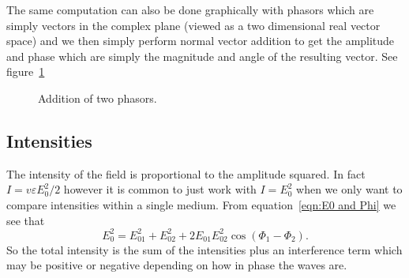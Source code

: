     The same computation can also be done graphically with phasors which are simply vectors in the complex plane (viewed as a two dimensional real vector space) and we then simply perform normal vector addition to get the amplitude and phase which are simply the magnitude and angle of the resulting vector.
    See figure~\ref{fig:phasor addition}
    \begin{figure}[ht]
        \centering
        \caption{Addition of two phasors.}
        \label{fig:phasor addition}
    \end{figure}
    
    \subsection{Intensities}
    The intensity of the field is proportional to the amplitude squared.
    In fact \(I = v\varepsilon E_0^2/2\) however it is common to just work with \(I = E_0^2\) when we only want to compare intensities within a single medium.
    From equation~\ref{eqn:E0 and Phi} we see that
    \[E_0^2 = E_{01}^2 + E_{02}^2 + 2E_{01}E_{02}^2\cos(\Phi_{1} - \Phi_{2}).\]
    So the total intensity is the sum of the intensities plus an interference term which may be positive or negative depending on how in phase the waves are.
    
